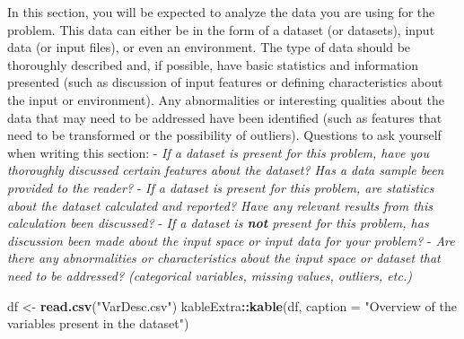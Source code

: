 \documentclass[
]{article}
\newenvironment{Shaded}{\begin{snugshade}}{\end{snugshade}}
\newcommand{\DataTypeTok}[1]{\textcolor[rgb]{0.13,0.29,0.53}{#1}}
\newcommand{\KeywordTok}[1]{\textcolor[rgb]{0.13,0.29,0.53}{\textbf{#1}}}
\newcommand{\NormalTok}[1]{#1}
\newcommand{\OperatorTok}[1]{\textcolor[rgb]{0.81,0.36,0.00}{\textbf{#1}}}
\newcommand{\StringTok}[1]{\textcolor[rgb]{0.31,0.60,0.02}{#1}}
\begin{document}
In this section, you will be expected to analyze the data you are using
for the problem. This data can either be in the form of a dataset (or
datasets), input data (or input files), or even an environment. The type
of data should be thoroughly described and, if possible, have basic
statistics and information presented (such as discussion of input
features or defining characteristics about the input or environment).
Any abnormalities or interesting qualities about the data that may need
to be addressed have been identified (such as features that need to be
transformed or the possibility of outliers). Questions to ask yourself
when writing this section: - \emph{If a dataset is present for this
problem, have you thoroughly discussed certain features about the
dataset? Has a data sample been provided to the reader?} - \emph{If a
dataset is present for this problem, are statistics about the dataset
calculated and reported? Have any relevant results from this calculation
been discussed?} - \emph{If a dataset is \textbf{not} present for this
problem, has discussion been made about the input space or input data
for your problem?} - \emph{Are there any abnormalities or
characteristics about the input space or dataset that need to be
addressed? (categorical variables, missing values, outliers, etc.)}

\begin{Shaded}
\begin{Highlighting}[]
\NormalTok{df <-}\StringTok{ }\KeywordTok{read.csv}\NormalTok{(}\StringTok{"VarDesc.csv"}\NormalTok{)}
\NormalTok{kableExtra}\OperatorTok{::}\KeywordTok{kable}\NormalTok{(df, }\DataTypeTok{caption =} \StringTok{"Overview of the variables present in the dataset"}\NormalTok{)}
\end{Highlighting}
\end{Shaded}
\end{document}

